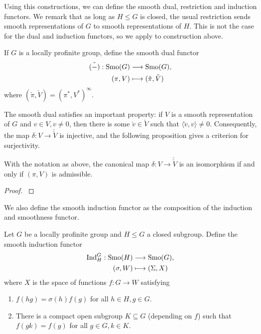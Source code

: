 Using this constructions, we can define the smooth dual, restriction and induction functors. We remark that as long as $H\leq G$ is closed, the usual restriction sends smooth representations of $G$ to smooth representations of $H$. This is not the case for the dual and induction functors, so we apply to construction above.

\begin{defn}
    If $G$ is a locally profinite group, define the smooth dual functor 
    \begin{align*}
        \check{(-)}:\mathrm{Smo}(G)&\longrightarrow\mathrm{Smo}(G),\\
        (\pi,V)&\longmapsto(\check{\pi},\check{V})
    \end{align*}
    where $(\check{\pi},\check{V})=(\pi^*,V^*)^\infty$.
\end{defn}

The smooth dual satisfies an important property: if $V$ is a smooth representation of $G$ and $v\in V, v\neq 0$, then there is some $\check{v}\in\check{V}$ such that $\langle\check{v},v\rangle\neq 0$. Consequently, the map $\delta:V\rightarrow\check{\check{V}}$ is injective, and the following proposition gives a criterion for surjectivity.

\begin{prop}
    With the notation as above, the canonical map $\delta:V\longrightarrow\check\check{V}$ is an isomorphism if and only if $(\pi,V)$ is admissible.
\end{prop}
\begin{proof}
    \cite[2.9 Proposition]{BH1}
\end{proof}

We also define the smooth induction functor as the composition of the induction and smoothness functor.

\begin{defn}\label{induction}
    Let $G$ be a locally profinite group and $H\leq G$ a closed subgroup. Define the smooth induction functor
    \begin{align*}
        \mathrm{Ind}_H^G:\mathrm{Smo}(H)&\longrightarrow\mathrm{Smo}(G),\\
        (\sigma,W)&\longmapsto(\Sigma,X)
    \end{align*}
    where $X$ is the space of functions $f: G\to W$ satisfying
	\begin{enumerate}
		\item $f(hg) = \sigma(h)f(g)$ for all $h\in H, g\in G$.
		\item There is a compact open subgroup $K\subseteq G$ (depending on $f$) such that $f(gk) = f(g)$ for all $g\in G, k\in K$.
	\end{enumerate}
\end{defn}

